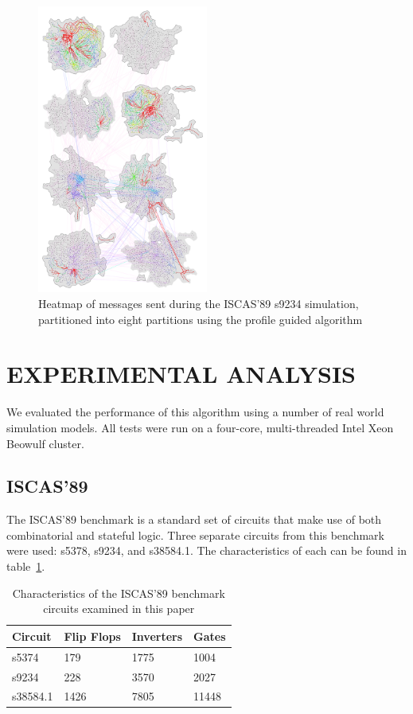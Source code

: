 \documentclass{wscpaperproc}
\begin{document}
\begin{figure}[h]
\centering
\includegraphics[clip=true,width=0.5\textwidth]{s9234_8part}
\caption{Heatmap of messages sent during the ISCAS'89 s9234 simulation, partitioned into eight partitions using the profile guided algorithm}
\label{fig:iscas8part}
\end{figure}

\section{EXPERIMENTAL ANALYSIS}\label{sec:analysis}

We evaluated the performance of this algorithm using a number of real world simulation models. All tests were run on a four-core, multi-threaded Intel Xeon Beowulf cluster.

\subsection{ISCAS’89}
The ISCAS’89 benchmark is a standard set of circuits that make use of both combinatorial and stateful logic. Three separate circuits from this benchmark were used: s5378, s9234, and s38584.1. The characteristics of each can be found in table~\ref{table:iscasStats}. 

\begin{table}[h]
\centering
\begin{tabular}{@{}llll@{}}
\toprule
Circuit  & Flip Flops & Inverters & Gates \\ \midrule
s5374    & 179        & 1775      & 1004  \\
s9234    & 228        & 3570      & 2027  \\
s38584.1 & 1426       & 7805      & 11448 \\ \bottomrule
\end{tabular}
\caption{Characteristics of the ISCAS'89 benchmark circuits examined in this paper}
\label{table:iscasStats}
\end{table}
\end{document}
